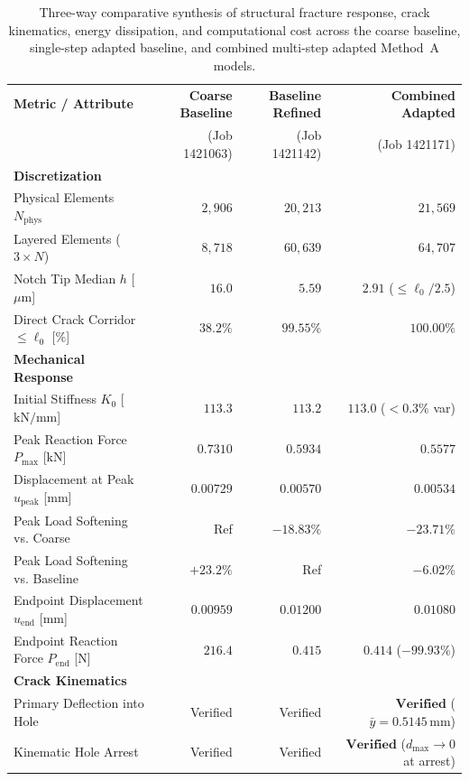 \begin{table}[htbp]
\centering
\footnotesize
\renewcommand{\arraystretch}{0.92}
\caption{Three-way comparative synthesis of structural fracture response, crack kinematics, energy dissipation, and computational cost across the coarse baseline, single-step adapted baseline, and combined multi-step adapted Method~A models.}
\label{tab:f1685_fracture_comparison}
\begin{tabularx}{\textwidth}{p{3.8cm}rrr}
\hline
\textbf{Metric / Attribute} & \textbf{Coarse Baseline} & \textbf{Baseline Refined} & \textbf{Combined Adapted} \\
 & (Job 1421063) & (Job 1421142) & (Job 1421171) \\
\hline
\textbf{Discretization} & & & \\
Physical Elements $N_{\mathrm{phys}}$ & $2{,}906$ & $20{,}213$ & $21{,}569$ \\
Layered Elements ($3\times N$) & $8{,}718$ & $60{,}639$ & $64{,}707$ \\
Notch Tip Median $h$ [$\mu\mathrm{m}$] & $16.0$ & $5.59$ & $\mathbf{2.91}$ ($\le \ell_0/2.5$) \\
Direct Crack Corridor $\le \ell_0$ [\%] & $38.2\%$ & $99.55\%$ & $\mathbf{100.00\%}$ \\
\hline
\textbf{Mechanical Response} & & & \\
Initial Stiffness $K_0$ [$\mathrm{kN/mm}$] & $113.3$ & $113.2$ & $113.0$ ($<0.3\%$ var) \\
Peak Reaction Force $P_{\max}$ [$\mathrm{kN}$] & $0.7310$ & $0.5934$ & $\mathbf{0.5577}$ \\
Displacement at Peak $u_{\mathrm{peak}}$ [$\mathrm{mm}$] & $0.00729$ & $0.00570$ & $\mathbf{0.00534}$ \\
Peak Load Softening vs. Coarse & Ref & $-18.83\%$ & $\mathbf{-23.71\%}$ \\
Peak Load Softening vs. Baseline & $+23.2\%$ & Ref & $\mathbf{-6.02\%}$ \\
Endpoint Displacement $u_{\mathrm{end}}$ [$\mathrm{mm}$] & $0.00959$ & $0.01200$ & $0.01080$ \\
Endpoint Reaction Force $P_{\mathrm{end}}$ [$\mathrm{N}$] & $216.4$ & $0.415$ & $\mathbf{0.414}$ ($-99.93\%$) \\
\hline
\textbf{Crack Kinematics} & & & \\
Primary Deflection into Hole & Verified & Verified & $\mathbf{Verified}$ ($\bar{y} = 0.5145\,\mathrm{mm}$) \\
Kinematic Hole Arrest & Verified & Verified & $\mathbf{Verified}$ ($d_{\max} \to 0$ at arrest) \\

\end{tabularx}
\end{table}
